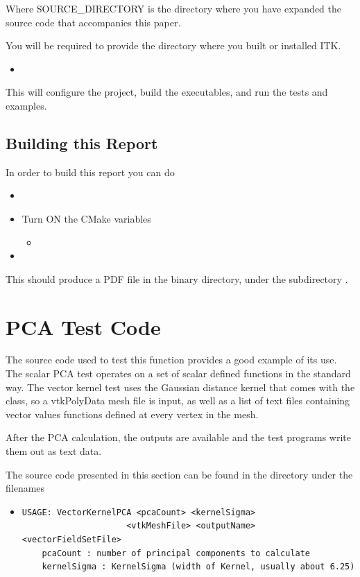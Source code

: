 \documentclass{InsightArticle}
\begin{document}
Where SOURCE\_DIRECTORY is the directory where you have expanded the source
code that accompanies this paper.

You will be required to provide the directory where you built or installed ITK.

\begin{itemize}
\item {}
\end{itemize}

This will configure the project, build the executables, and run the tests and
examples. 


\subsection{Building this Report}

In order to build this report you can do

\begin{itemize}
\item {}
\item Turn ON the CMake variables
\begin{itemize}
\item {}
\end{itemize}
\item {}
\end{itemize}

This should produce a PDF file in the binary directory, under the subdirectory
.

\section{PCA Test Code}

The source code used to test this function provides a good example of its
use.  The scalar PCA test operates on a set of scalar defined functions in
the standard way.  The vector kernel test uses the Gaussian distance kernel
that comes with the class, so a vtkPolyData mesh file is input, as well as
a list of text files containing vector values functions defined at every
vertex in the mesh.

After the PCA calculation, the outputs are available and the test programs
write them out as text data.

The source code presented in this section can be found in the 
directory under the filenames

\begin{itemize}
\item {}

\begin{verbatim}USAGE: VectorKernelPCA <pcaCount> <kernelSigma>
                     <vtkMeshFile> <outputName> <vectorFieldSetFile>
    pcaCount : number of principal components to calculate
    kernelSigma : KernelSigma (width of Kernel, usually about 6.25)
\end{verbatim}
\end{itemize}
\end{document}
